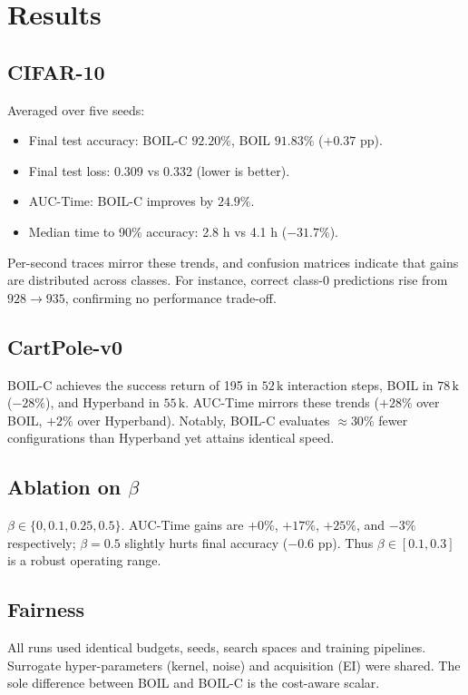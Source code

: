 \documentclass{article} %
\begin{document}
\section{Results}
\label{sec:results}
\subsection{CIFAR-10}
Averaged over five seeds:
\begin{itemize}
  \item Final test accuracy: BOIL-C \(92.20\%\), BOIL \(91.83\%\) (\(+0.37\) pp).
  \item Final test loss: 0.309 vs 0.332 (lower is better).
  \item AUC-Time: BOIL-C improves by \(24.9\%\).
  \item Median time to 90\% accuracy: 2.8 h vs 4.1 h (\(-31.7\%\)).
\end{itemize}
Per-second traces mirror these trends, and confusion matrices indicate that gains are distributed across classes. For instance, correct class-0 predictions rise from \(928 \rightarrow 935\), confirming no performance trade-off.

\subsection{CartPole-v0}
BOIL-C achieves the success return of 195 in \(52\,\text{k}\) interaction steps, BOIL in \(78\,\text{k}\) (\(-28\%\)), and Hyperband in \(55\,\text{k}\). AUC-Time mirrors these trends (\(+28\%\) over BOIL, \(+2\%\) over Hyperband). Notably, BOIL-C evaluates \(\approx 30\%\) fewer configurations than Hyperband yet attains identical speed.

\subsection{Ablation on \(\beta\)}
\(\beta\in\{0, 0.1, 0.25, 0.5\}\). AUC-Time gains are \(+0\%\), \(+17\%\), \(+25\%\), and \(-3\%\) respectively; \(\beta=0.5\) slightly hurts final accuracy (\(-0.6\) pp). Thus \(\beta\in[0.1, 0.3]\) is a robust operating range.

\subsection{Fairness}
All runs used identical budgets, seeds, search spaces and training pipelines. Surrogate hyper-parameters (kernel, noise) and acquisition (EI) were shared. The sole difference between BOIL and BOIL-C is the cost-aware scalar.
\end{document}
